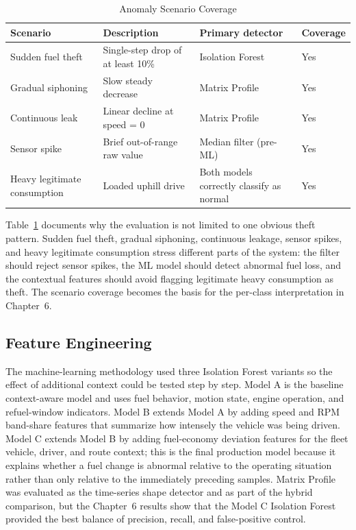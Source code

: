 \begin{table}[!htbp]
\centering
\caption{Anomaly Scenario Coverage}
\label{tab:anomaly_scenario_coverage}
\scriptsize
\begin{tabular}{|p{}|p{}|p{}|p{}|}
\hline
\textbf{Scenario} & \textbf{Description} & \textbf{Primary detector} & \textbf{Coverage} \\
\hline
Sudden fuel theft & Single-step drop of at least 10\% & Isolation Forest & Yes \\
\hline
Gradual siphoning & Slow steady decrease & Matrix Profile & Yes \\
\hline
Continuous leak & Linear decline at speed = 0 & Matrix Profile & Yes \\
\hline
Sensor spike & Brief out-of-range raw value & Median filter (pre-ML) & Yes \\
\hline
Heavy legitimate consumption & Loaded uphill drive & Both models correctly classify as normal & Yes \\
\hline
\end{tabular}
\normalsize
\end{table}

\noindent
Table~\ref{tab:anomaly_scenario_coverage} documents why the evaluation is not limited to one obvious theft pattern. Sudden fuel theft, gradual siphoning, continuous leakage, sensor spikes, and heavy legitimate consumption stress different parts of the system: the filter should reject sensor spikes, the ML model should detect abnormal fuel loss, and the contextual features should avoid flagging legitimate heavy consumption as theft. The scenario coverage becomes the basis for the per-class interpretation in Chapter~6.

\subsection{Feature Engineering}

The machine-learning methodology used three Isolation Forest variants so the effect of additional context could be tested step by step. Model A is the baseline context-aware model and uses fuel behavior, motion state, engine operation, and refuel-window indicators. Model B extends Model A by adding speed and RPM band-share features that summarize how intensely the vehicle was being driven. Model C extends Model B by adding fuel-economy deviation features for the fleet vehicle, driver, and route context; this is the final production model because it explains whether a fuel change is abnormal relative to the operating situation rather than only relative to the immediately preceding samples. Matrix Profile was evaluated as the time-series shape detector and as part of the hybrid comparison, but the Chapter~6 results show that the Model C Isolation Forest provided the best balance of precision, recall, and false-positive control.

